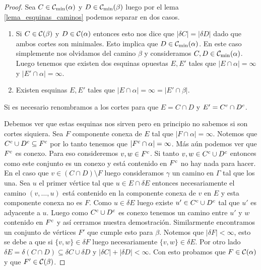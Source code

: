 \documentclass[tesis.tex]{subfiles}
\begin{document}
\begin{proof}
	Sea $C \in {\cal C}_{\text{min}}(\alpha)$ y $D \in {\cal C}_{\text{min}}(\beta)$ luego por el lema \ref{lema_esquinas_caminos} podemos separar en dos casos.
	\begin{enumerate}
		\item Si $C \in {\cal C}(\beta)$ y $D \in {\cal C}(\alpha)$ entonces esto nos dice que $|\delta C| = |\delta D|$ dado que ambos cortes son minimales.
		Esto implica que $D \in {\cal C}_{\text{min}}(\alpha)$. 
		En este caso simplemente nos olvidamos del camino $\beta$ y consideramos $C,D \in {\cal C}_{\text{min}}(\alpha)$.
		Luego tenemos que existen dos esquinas opuestas $E,E'$ tales que $|E \cap \alpha| = \infty$ y $|E' \cap \alpha| = \infty$.
		\item Existen esquinas $E,E'$ tales que $|E \cap \alpha| = \infty = |E' \cap \beta|$.
	\end{enumerate}	
	
	Si es necesario renombramos a los cortes para que $E = C \cap D$ y $E' = C^{c} \cap D^{c}$.
	
	
	Debemos ver que estas esquinas nos sirven pero en principio no sabemos si son cortes siquiera.
	Sea $F$ componente conexa de $E$ tal que $|F \cap \alpha| = \infty$.
	Notemos que $C^{c} \cup D^{c} \subseteq F^{c}$ por lo tanto tenemos que $|F^{c} \cap \alpha|=\infty$.
	Más aún podemos ver que $F^{c}$ es conexo.
	Para eso consideremos $v,w \in F^{c}$.
	Si tanto $v,w \in C^{c} \cup D^{c}$ entonces como este conjunto es un conexo y está contenido en $F^{c}$ no hay nada para hacer.
	En el caso que $v \in (C \cap D) \setminus F$ luego consideramos $\gamma$ un camino en $\Gamma$ tal que los una.
	Sea $u$ el primer vértice tal que $u \in E \cap \delta E$ entonces necesariamente el camino $(v, \dots, u)$ está contenido en la componente conexa de $v$ en $E$ y esta componente conexa no es $F$. 
	Como $u \in \delta E$ luego existe $u' \in C^{c} \cup D^{c}$ tal que $u'$ es adyacente a $u$. 
	Luego como $C^{c} \cup D^{c}$ es conexo tenemos un camino entre $u'$ y $w$ contenido en $F^{c}$ y así cerramos nuestra demostración.
	Similarmente encontramos un conjunto de vértices $F'$ que cumple esto para $\beta$.
	Notemos que $|\delta F| < \infty$, esto se debe a que si $\{ v,w \} \in \delta F$ luego necesariamente $\{v,w\} \in \delta E$.
	Por otro lado $\delta E = \delta (C \cap D)  \subseteq \delta C \cup \delta D$ y $|\delta C| + |\delta D| < \infty$. 
	Con esto probamos que $F \in {\cal C}(\alpha)$ y que $F' \in {\cal C}(\beta)$.
	
	

\end{proof}
\end{document}
